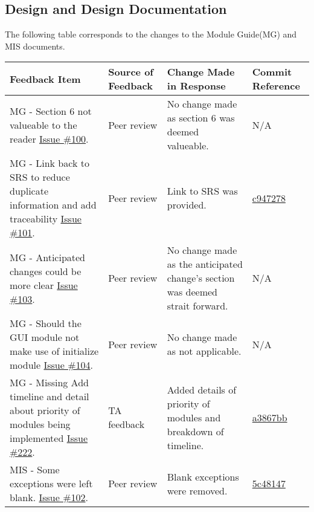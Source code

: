 \documentclass{article}
\begin{document}
\subsection{Design and Design Documentation}
The following table corresponds to the changes to the Module Guide(MG) and MIS documents. 
\begin{longtable}{|p{4cm}|p{1.5cm}|p{4cm}|p{1.5cm}|}
    \hline
    \textbf{Feedback Item} & \textbf{Source of Feedback} & \textbf{Change Made in Response} & \textbf{Commit Reference} \\
    \hline
    \endfirsthead
    \hline
    \endhead
    \hline
    \endfoot
    \hline
    \endlastfoot
    MG - Section 6 not valueable to the reader \href{https://github.com/gr812b/CVT-Simulator/issues/100}{Issue \#100}. & Peer review  & No change made as section 6 was deemed valueable.& N/A \\
    \hline
    MG - Link back to SRS to reduce duplicate information and add traceability \href{https://github.com/gr812b/CVT-Simulator/issues/101}{Issue \#101}. & Peer review  & Link to SRS was provided.& 
    \href{https://github.com/gr812b/CVT-Simulator/commit/c9472786934ffacbad18ab7b65ed8313451e8ada}{c947278} \\ 
    \hline
    MG - Anticipated changes could be more clear \href{https://github.com/gr812b/CVT-Simulator/issues/103}{Issue \#103}. & Peer review  & No change made as the anticipated change's section was deemed strait forward.& N/A \\
    \hline

    MG - Should the GUI module not make use of initialize module \href{https://github.com/gr812b/CVT-Simulator/issues/104}{Issue \#104}. & Peer review  & No change made as not applicable. & N/A \\
    \hline

    MG - Missing Add timeline and detail about priority of modules being implemented \href{https://github.com/gr812b/CVT-Simulator/issues/222}{Issue \#222}. & TA feedback  & Added details of priority of modules and breakdown of timeline. & 
    \href{https://github.com/gr812b/CVT-Simulator/commit/a3867bbdd214e4d35cc654ba57f8a74de16630c5}{a3867bb} \\
    \hline

    MIS - Some exceptions were left blank. \href{https://github.com/gr812b/CVT-Simulator/issues/102}{Issue \#102}. & Peer review  & Blank exceptions were removed. & 
    \href{https://github.com/gr812b/CVT-Simulator/commit/5c48147b343cc93bd576ef4c185cf6708cb6ad26}{5c48147} \\ 

\end{longtable}
\end{document}
